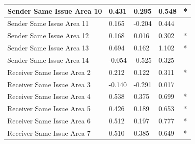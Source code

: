 \documentclass[headsepline=true, abstracton]{scrartcl}
\begin{document}
\begin{table}[H]
\begin{tabular}{|
>{\columncolor[HTML]{EFEFEF}}l |l|l|l|l|}
Sender Same Issue Area 10                   & 0.431                            & 0.295                               & 0.548                               & *                                    \\ \hline
Sender Same Issue Area 11                   & 0.165                            & -0.204                              & 0.444                               &                                      \\ \hline
Sender Same Issue Area 12                   & 0.168                            & 0.016                               & 0.302                               & *                                    \\ \hline
Sender Same Issue Area 13                   & 0.694                            & 0.162                               & 1.102                               & *                                    \\ \hline
Sender Same Issue Area 14                   & -0.054                           & -0.525                              & 0.325                               &                                      \\ \hline
Receiver Same Issue Area 2                  & 0.212                            & 0.122                               & 0.311                               & *                                    \\ \hline
Receiver Same Issue Area 3                  & -0.140                           & -0.291                              & 0.017                               &                                      \\ \hline
Receiver Same Issue Area 4                  & 0.538                            & 0.375                               & 0.699                               & *                                    \\ \hline
Receiver Same Issue Area 5                  & 0.426                            & 0.189                               & 0.653                               & *                                    \\ \hline
Receiver Same Issue Area 6                  & 0.512                            & 0.197                               & 0.777                               & *                                    \\ \hline
Receiver Same Issue Area 7                  & 0.510                            & 0.385                               & 0.649                               & *                                    \\ \hline

\end{tabular}
\end{table}
\end{document}
